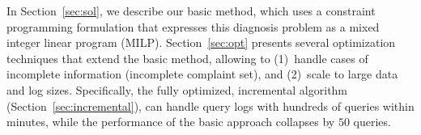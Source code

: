 In Section~\ref{sec:sol}, we describe our basic method, 
which
uses a constraint programming formulation that expresses this
diagnosis problem as a mixed integer linear program (MILP). 
Section~\ref{sec:opt} presents several optimization
techniques that extend the basic method, allowing \sys to 
(1)~handle cases of incomplete information (incomplete complaint set), and
(2)~scale to large data and log sizes. 
Specifically, the fully optimized, incremental algorithm (Section~\ref{sec:incremental}), can
handle query logs with hundreds of queries within minutes, while the performance of the basic approach collapses by $50$ queries.

\iffalse Due to space considerations, we omit discussion of alternative approaches that use classification tools and linear systems of equations.
These approaches are limited to a query log containing a single query, and are discussed and evaluated in more detail in our technical report~\cite{qfixarxiv}. 
\fi




